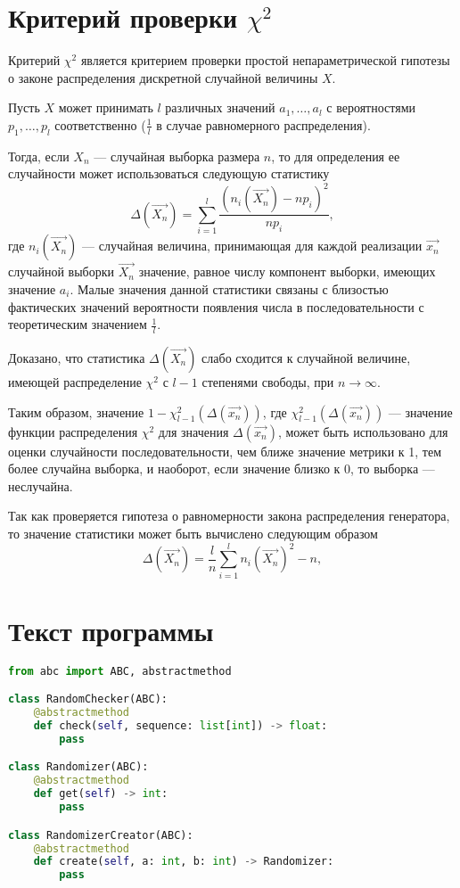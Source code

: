 \section*{Критерий проверки $\chi^2$}

Критерий $\chi^2$ является критерием проверки простой непараметрической
гипотезы о законе распределения дискретной случайной величины $X$.

Пусть $X$ может принимать $l$ различных значений $a_1, \dots, a_l$ с
вероятностями $p_1, \dots, p_l$ соответственно ($\frac{1}{l}$ в случае
равномерного распределения).

Тогда, если $X_n$ --- случайная выборка размера $n$, то для определения
ее случайности может использоваться следующую статистику
\begin{equation*}
    \Delta(\overrightarrow{X_n}) = \sum_{i = 1}^{l} \frac{(n_i(\overrightarrow{X_n}) - n p_i) ^ 2}{n p_i},
\end{equation*}
где $n_i(\overrightarrow{X_n})$ --- случайная величина, принимающая для каждой
реализации $\overrightarrow{x_n}$ случайной выборки $\overrightarrow{X_n}$
значение, равное числу компонент выборки, имеющих значение $a_i$.
Малые значения данной статистики связаны с близостью фактических
значений вероятности появления числа в последовательности с теоретическим
значением $\frac{1}{l}$.

Доказано, что статистика $\Delta(\overrightarrow{X_n})$ слабо сходится
к случайной величине, имеющей распределение $\chi^2$ с $l - 1$ степенями
свободы, при $n \rightarrow \infty$.

Таким образом, значение $1 - \chi^2_{l - 1}(\Delta(\overrightarrow{x_n}))$,
где $\chi^2_{l - 1}(\Delta(\overrightarrow{x_n}))$ --- значение функции
распределения $\chi^2$ для значения $\Delta(\overrightarrow{x_n})$, может
быть использовано для оценки случайности последовательности, чем
ближе значение метрики к 1, тем более случайна выборка, и наоборот, если
значение близко к 0, то выборка --- неслучайна.

Так как проверяется гипотеза о равномерности закона распределения генератора,
то значение статистики может быть вычислено следующим образом
\begin{equation*}
    \Delta(\overrightarrow{X_n}) = \frac{l}{n} \sum_{i = 1}^{l} n_i(\overrightarrow{X_n}) ^ 2 - n,
\end{equation*}

\section*{Текст программы}
\begin{lstlisting}[caption={Интерфейс генератора случайных чисел}, language=python]
from abc import ABC, abstractmethod

class RandomChecker(ABC):
    @abstractmethod
    def check(self, sequence: list[int]) -> float:
        pass

class Randomizer(ABC):
    @abstractmethod
    def get(self) -> int:
        pass

class RandomizerCreator(ABC):
    @abstractmethod
    def create(self, a: int, b: int) -> Randomizer:
        pass
\end{lstlisting}

